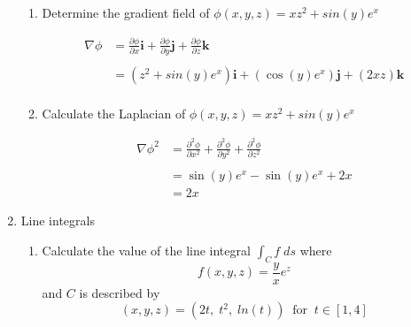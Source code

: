 \documentclass[a4paper,11pt]{article}
\begin{document}
\begin{preview}
\begin{enumerate}
\begin{enumerate}
    \item Determine the gradient field of $\phi(x,y,z) = xz^2 + sin(y)e^x$
    
    \begin{align*}
        \nabla \phi &= \frac{\partial \phi}{ \partial x} \textbf{i} + \frac{\partial \phi}{ \partial y} \textbf{j} + \frac{\partial \phi}{ \partial z} \textbf{k}\\\\
        &= \left(z^2 + sin(y)e^x\right) \textbf{i} + \left( \cos(y)e^x \right) \textbf{j} + \left( 2xz \right) \textbf{k}\\
    \end{align*}

    \item Calculate the Laplacian of $\phi(x,y,z) = xz^2 + sin(y)e^x$ 
    
    \begin{align*}
        \nabla \phi ^2 &= \frac{\partial^2 \phi}{ \partial x^2} + \frac{\partial^2 \phi}{ \partial y^2} + \frac{\partial^2 \phi}{ \partial z^2} \\\\
        &= \sin(y)e^x -\sin(y)e^x + 2x\\
        &=2x
    \end{align*}

\end{enumerate}

\item Line integrals

\begin{enumerate}
    \item Calculate the value of the line integral $\int_C f \; ds$ where
    $$ f(x,y,z) = \frac{y}{x}e^z $$
    and $C$ is described by 
    $$(x,y,z) = (2t, \; t^2, \; ln(t)) \;\;\mathrm{for} \;\; t \in [1,4]$$


\end{enumerate}
\end{enumerate}
\end{preview}
\end{document}
